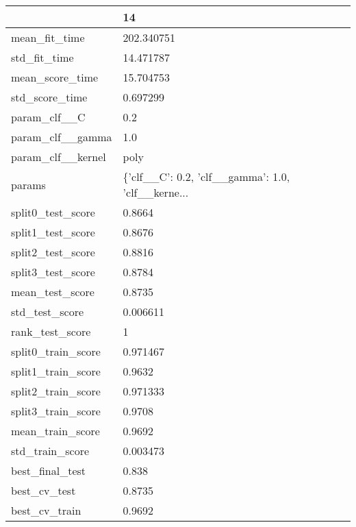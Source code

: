 \begin{tabular}{ll}
\toprule
{} &                                                 14 \\
\midrule
mean\_fit\_time      &                                         202.340751 \\
std\_fit\_time       &                                          14.471787 \\
mean\_score\_time    &                                          15.704753 \\
std\_score\_time     &                                           0.697299 \\
param\_clf\_\_C       &                                                0.2 \\
param\_clf\_\_gamma   &                                                1.0 \\
param\_clf\_\_kernel  &                                               poly \\
params             &  \{'clf\_\_C': 0.2, 'clf\_\_gamma': 1.0, 'clf\_\_kerne... \\
split0\_test\_score  &                                             0.8664 \\
split1\_test\_score  &                                             0.8676 \\
split2\_test\_score  &                                             0.8816 \\
split3\_test\_score  &                                             0.8784 \\
mean\_test\_score    &                                             0.8735 \\
std\_test\_score     &                                           0.006611 \\
rank\_test\_score    &                                                  1 \\
split0\_train\_score &                                           0.971467 \\
split1\_train\_score &                                             0.9632 \\
split2\_train\_score &                                           0.971333 \\
split3\_train\_score &                                             0.9708 \\
mean\_train\_score   &                                             0.9692 \\
std\_train\_score    &                                           0.003473 \\
best\_final\_test    &                                              0.838 \\
best\_cv\_test       &                                             0.8735 \\
best\_cv\_train      &                                             0.9692 \\
\bottomrule
\end{tabular}
